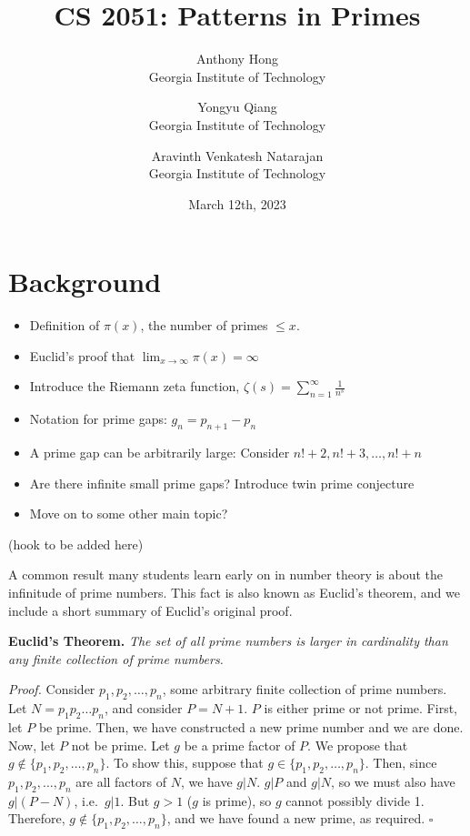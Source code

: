 \documentclass[12pt, letterpaper]{article}
\title{CS 2051: Patterns in Primes}
\author{Anthony Hong \\ Georgia Institute of Technology
\and Yongyu Qiang \\ Georgia Institute of Technology
\and Aravinth Venkatesh Natarajan \\ Georgia Institute of Technology}
\date{March 12th, 2023}
\begin{document}
\maketitle

\section{Background}
\begin{itemize}
  \item Definition of $\pi(x)$, the number of primes $\le x$.
  \item Euclid's proof that $\lim_{x \to \infty}\pi(x) = \infty$
  \item Introduce the Riemann zeta function, $\zeta(s) = \sum_{n = 1}^{\infty}\frac{1}{n^s}$
  \item Notation for prime gaps: $g_n = p_{n + 1} - p_n$
  \item A prime gap can be arbitrarily large: Consider $n! + 2, n! + 3, \dots, n! + n$
  \item Are there infinite small prime gaps? Introduce twin prime conjecture
  \item Move on to some other main topic?
\end{itemize}

(hook to be added here)

A common result many students learn early on in number theory is about the
infinitude of prime numbers. This fact is also known as Euclid's theorem,
and we include a short summary of Euclid's original proof.

\noindent
\textbf{Euclid's Theorem.} \textit{The set of all prime numbers is larger
in cardinality than any finite collection of prime numbers.}

\noindent
\textit{Proof.} Consider $p_1, p_2, \dots, p_n$, some arbitrary finite
collection of
prime numbers. Let $N = p_1p_2 \dots p_n$, and consider $P = N + 1$. $P$ is
either prime or not prime.
\newline\indent
First, let $P$ be prime. Then, we have constructed a new prime number and
we are done.
\newline\indent
Now, let $P$ not be prime. Let $g$ be a prime factor of $P$. We propose that
$g \notin \{p_1, p_2, \dots, p_n\}$. To show this, suppose that
$g \in \{p_1, p_2, \dots, p_n\}$. Then, since $p_1, p_2, \dots, p_n$ are all
factors of $N$, we have $g | N$. $g | P$ and $g | N$, so
we must also have $g | (P - N)$, i.e.\ $g | 1$. But $g > 1$ ($g$ is prime),
so $g$ cannot possibly divide 1. Therefore,
$g \notin \{p_1, p_2, \dots, p_n\}$, and we have found a new prime, as
required. \hfill$\square$
\end{document}

